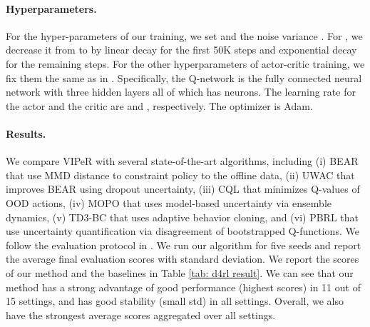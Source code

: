 \documentclass{article} \usepackage{iclr2023/iclr2023_conference,times}
\begin{document}
\paragraph{Hyperparameters.} For the hyper-parameters of our training, we set  and the noise variance . For , we decrease it from  to  by linear decay for the first 50K steps and exponential decay for the remaining steps. For the other hyperparameters of actor-critic training, we fix them the same as in \cite{bai2022pessimistic}. Specifically, the Q-network is the fully connected neural network with three hidden layers all of which has  neurons. The learning rate for the actor and the critic are  and , respectively. The optimizer is Adam. 

\paragraph{Results.} We compare VIPeR with several state-of-the-art algorithms, including (i) BEAR \citep{DBLP:conf/nips/KumarFSTL19} that use MMD distance to constraint policy to the offline data, (ii) UWAC \citep{DBLP:conf/icml/0001ZSSZSG21} that improves BEAR using dropout uncertainty, (iii) CQL \citep{DBLP:conf/nips/KumarZTL20} that minimizes Q-values of OOD actions, (iv) MOPO \citep{DBLP:conf/nips/YuTYEZLFM20} that uses model-based uncertainty via ensemble dynamics, (v) TD3-BC \citep{DBLP:conf/nips/FujimotoG21} that uses adaptive behavior cloning, and (vi) PBRL \citep{bai2022pessimistic} that use uncertainty quantification via disagreement of bootstrapped Q-functions. We follow the evaluation protocol in \cite{bai2022pessimistic}. We run our algorithm for five seeds and report the average final evaluation scores with standard deviation. We report the scores of our method and the baselines in Table \ref{tab: d4rl result}. We can see that our method has a strong advantage of good performance (highest scores) in 11 out of 15 settings, and has good stability (small std) in all settings. Overall, we also have the strongest average scores aggregated over all settings. 
\end{document}
